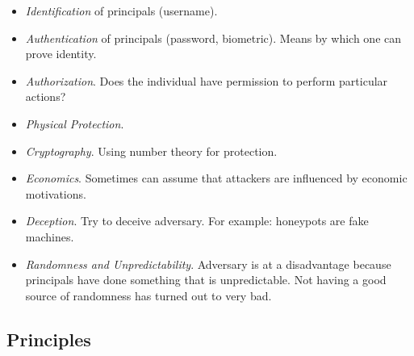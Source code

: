 \documentclass[psamsfonts]{amsart}
\begin{document}
\begin{itemize}
\item \emph{Identification} of principals (username).
\item \emph{Authentication} of principals (password, biometric). Means by which one can prove identity.
\item \emph{Authorization}. Does the individual have permission to perform particular actions?
\item \emph{Physical Protection}. 
\item \emph{Cryptography}. Using number theory for protection.
\item \emph{Economics}. Sometimes can assume that attackers are influenced by economic motivations.
\item \emph{Deception}. Try to deceive adversary. For example: honeypots are fake machines.
\item \emph{Randomness and Unpredictability}. Adversary is at a disadvantage because principals have done something that is unpredictable. Not having a good source of randomness has turned out to very bad.
\end{itemize}

\subsection{Principles}
\end{document}
